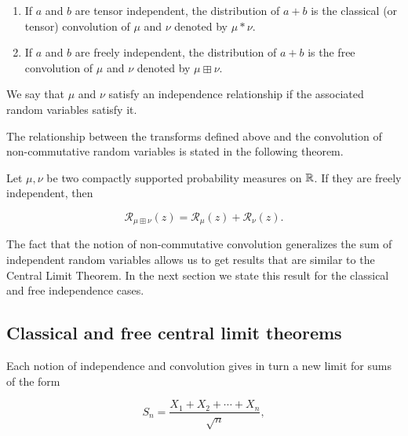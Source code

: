     \begin{enumerate}
        \item If $a$ and $b$ are tensor independent, the distribution of $a+b$ is the classical (or tensor) convolution of $\mu$ and $\nu$ denoted by $\mu*\nu$.
        
        
        
        \item If $a$ and $b$ are freely independent, the distribution of $a+b$ is the free convolution of $\mu$ and $\nu$ denoted by $\mu \boxplus \nu$.
    \end{enumerate}

    We say that $\mu$ and $\nu$ satisfy an independence relationship if the associated random variables satisfy it. 
    
    The relationship between the transforms defined above and the convolution of non-commutative random variables is stated in the following theorem.

    \begin{theorem}
        Let $\mu,\nu$ be two compactly supported probability measures on $\mathbb R$. If they are freely independent, then
            
            \[ \mathcal R_{\mu \boxplus \nu}(z) = \mathcal R_{\mu}(z) + \mathcal R_{\nu} (z).\]
    \end{theorem}

    The fact that the notion of non-commutative convolution generalizes the sum of independent random variables allows us to get results that are similar to the Central Limit Theorem. In the next section we state this result for the classical and free independence cases.

\subsection{Classical and free central limit theorems}

    Each notion of independence and convolution gives in turn a new limit for sums of the form

    \[ S_n = \frac{X_1 + X_2 + \cdots + X_n}{\sqrt{n}}, \]

